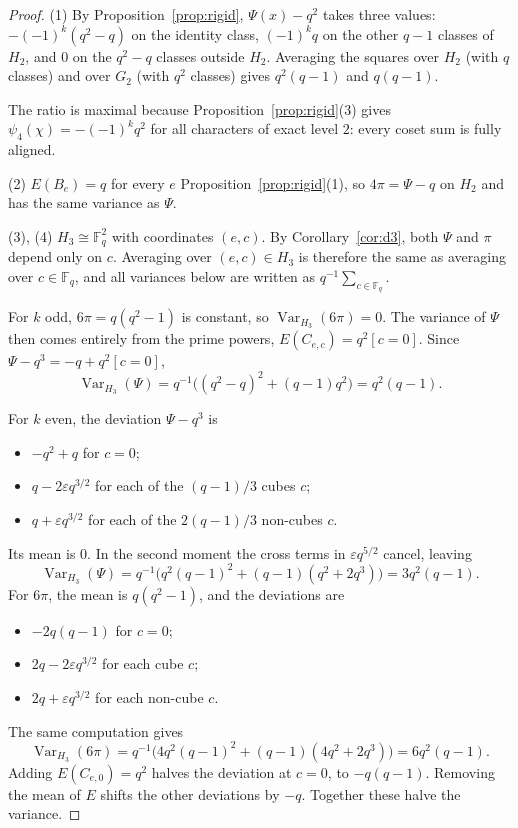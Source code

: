 \documentclass[11pt,a4paper]{amsart}
\theoremstyle{definition}
\theoremstyle{remark}
\newcommand{\F}{\mathbb{F}}
\newcommand{\Var}{\operatorname{Var}}
\begin{document}
\begin{proof}
(1) By Proposition~\ref{prop:rigid}, $\Psi(x)-q^2$ takes three values: $-(-1)^k(q^2-q)$ on the identity class,
$(-1)^kq$ on the other $q-1$ classes of $H_2$, and $0$ on the $q^2-q$ classes outside $H_2$. Averaging the squares
over $H_2$ (with $q$ classes) and over $G_2$ (with $q^2$ classes) gives $q^2(q-1)$ and $q(q-1)$.

The ratio is maximal because Proposition~\ref{prop:rigid}(3) gives $\psi_4(\chi)=-(-1)^kq^2$ for all characters of exact
level $2$: every coset sum is fully aligned.

(2) $E(B_e)=q$ for every $e$ Proposition~\ref{prop:rigid}(1), so $4\pi=\Psi-q$ on $H_2$ and has the same variance as
$\Psi$.

(3), (4) $H_3\cong\F_q^2$ with coordinates $(e,c)$. By Corollary~\ref{cor:d3}, both $\Psi$ and $\pi$ depend only on
$c$. Averaging over $(e,c)\in H_3$ is therefore the same as averaging over $c\in\F_q$, and all variances below are
written as $q^{-1}\sum_{c\in\F_q}$.

For $k$ odd, $6\pi=q(q^2-1)$ is constant, so $\Var_{H_3}(6\pi)=0$. The variance of $\Psi$ then comes entirely from
the prime powers, $E(C_{e,c})=q^2[c=0]$. Since $\Psi-q^3=-q+q^2[c=0]$,
\[
\Var_{H_3}(\Psi)=q^{-1}\bigl((q^2-q)^2+(q-1)q^2\bigr)=q^2(q-1).
\]

For $k$ even, the deviation $\Psi-q^3$ is
\begin{itemize}
\item $-q^2+q$ for $c=0$;
\item $q-2\varepsilon q^{3/2}$ for each of the $(q-1)/3$ cubes $c$;
\item $q+\varepsilon q^{3/2}$ for each of the $2(q-1)/3$ non-cubes $c$.
\end{itemize}
Its mean is $0$. In the second moment the cross terms in $\varepsilon q^{5/2}$ cancel, leaving
\[
\Var_{H_3}(\Psi)=q^{-1}\bigl(q^2(q-1)^2+(q-1)(q^2+2q^3)\bigr)=3q^2(q-1).
\]
For $6\pi$, the mean is $q(q^2-1)$, and the deviations are
\begin{itemize}
\item $-2q(q-1)$ for $c=0$;
\item $2q-2\varepsilon q^{3/2}$ for each cube $c$;
\item $2q+\varepsilon q^{3/2}$ for each non-cube $c$.
\end{itemize}
The same computation gives
\[
\Var_{H_3}(6\pi)=q^{-1}\bigl(4q^2(q-1)^2+(q-1)(4q^2+2q^3)\bigr)=6q^2(q-1).
\]
Adding $E(C_{e,0})=q^2$ halves the deviation at $c=0$, to $-q(q-1)$. Removing the mean of $E$ shifts the other
deviations by $-q$. Together these halve the variance.
\end{proof}
\end{document}
